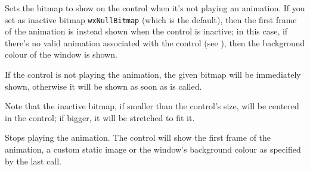 Sets the bitmap to show on the control when it's not playing an animation.
If you set as inactive bitmap {\tt wxNullBitmap} (which is the default), then the
first frame of the animation is instead shown when the control is inactive; in this case,
if there's no valid animation associated with the control (see ),
then the background colour of the window is shown.

If the control is not playing the animation, the given bitmap will be immediately
shown, otherwise it will be shown as soon as 
is called.

Note that the inactive bitmap, if smaller than the control's size, will be centered in
the control; if bigger, it will be stretched to fit it.


\label{wxanimationctrlstop}


Stops playing the animation.
The control will show the first frame of the animation, a custom static image or
the window's background colour as specified by the
last  call.

